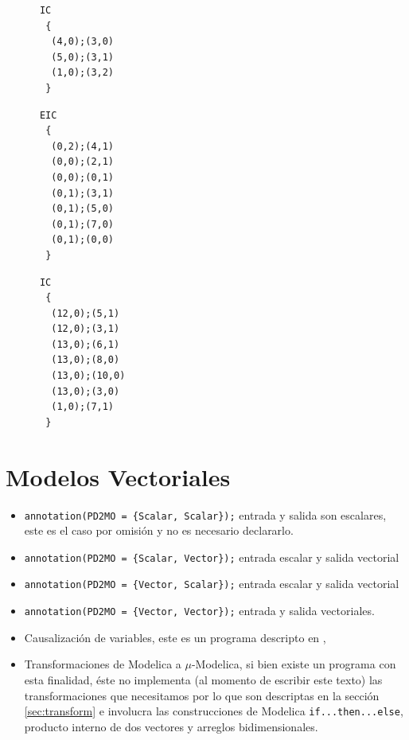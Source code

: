 \documentclass{beamer}
\newcommand{\customcite}[1]{\citetitle{#1}, \citeyear{#1}}
\begin{document}
\begin{frame}[fragile]
\begin{minipage}[t]{0.3\linewidth}
\begin{verbatim}
      IC
       {
        (4,0);(3,0)
        (5,0);(3,1)
        (1,0);(3,2)
       }
\end{verbatim}
\end{minipage}
\begin{minipage}[t]{0.3\linewidth}
\begin{verbatim}
      EIC
       {
        (0,2);(4,1)
        (0,0);(2,1)
        (0,0);(0,1)
        (0,1);(3,1)
        (0,1);(5,0)
        (0,1);(7,0)
        (0,1);(0,0)
       }
\end{verbatim}
\end{minipage}
\begin{minipage}[t]{0.3\linewidth}
\begin{verbatim}
      IC
       {
        (12,0);(5,1)
        (12,0);(3,1)
        (13,0);(6,1)
        (13,0);(8,0)
        (13,0);(10,0)
        (13,0);(3,0)
        (1,0);(7,1)
       }
\end{verbatim}
\end{minipage}
\end{frame}


\section{Modelos Vectoriales}
\begin{frame}
\begin{itemize}
	\item \texttt{annotation(PD2MO = \{Scalar, Scalar\});} entrada y salida son escalares, este es el caso por omisión y no es necesario declararlo.
	\item \texttt{annotation(PD2MO = \{Scalar, Vector\});} entrada escalar y salida vectorial
	\item \texttt{annotation(PD2MO = \{Vector, Scalar\});} entrada escalar y salida vectorial
	\item \texttt{annotation(PD2MO = \{Vector, Vector\});} entrada y salida vectoriales.
\end{itemize}
\end{frame}

	\begin{itemize}
	\item Causalización de variables, este es un programa descripto en \customcite{Mod15}
	\item Transformaciones de Modelica a $\mu$-Modelica, si bien existe un programa con esta finalidad, éste no implementa (al momento de escribir este texto)
	las transformaciones que necesitamos por lo que son descriptas en la sección \ref{sec:transform} e involucra las construcciones de Modelica 
		\texttt{if...then...else}, producto interno de dos vectores y arreglos bidimensionales.
	\end{itemize}
\end{document}
